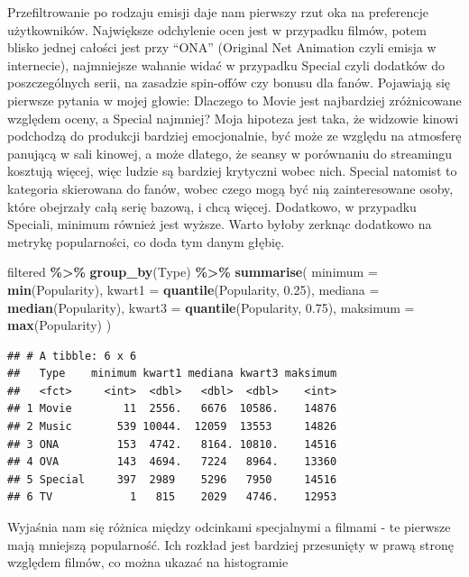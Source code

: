 \documentclass[
]{article}
\newenvironment{Shaded}{\begin{snugshade}}{\end{snugshade}}
\newcommand{\AttributeTok}[1]{\textcolor[rgb]{0.13,0.29,0.53}{#1}}
\newcommand{\FloatTok}[1]{\textcolor[rgb]{0.00,0.00,0.81}{#1}}
\newcommand{\FunctionTok}[1]{\textcolor[rgb]{0.13,0.29,0.53}{\textbf{#1}}}
\newcommand{\NormalTok}[1]{#1}
\newcommand{\SpecialCharTok}[1]{\textcolor[rgb]{0.81,0.36,0.00}{\textbf{#1}}}
\begin{document}
Przefiltrowanie po rodzaju emisji daje nam pierwszy rzut oka na
preferencje użytkowników. Największe odchylenie ocen jest w przypadku
filmów, potem blisko jednej całości jest przy ``ONA'' (Original Net
Animation czyli emisja w internecie), najmniejsze wahanie widać w
przypadku Special czyli dodatków do poszczególnych serii, na zasadzie
spin-offów czy bonusu dla fanów. Pojawiają się pierwsze pytania w mojej
głowie: Dlaczego to Movie jest najbardziej zróżnicowane względem oceny,
a Special najmniej? Moja hipoteza jest taka, że widzowie kinowi
podchodzą do produkcji bardziej emocjonalnie, być może ze względu na
atmosferę panującą w sali kinowej, a może dlatego, że seansy w
porównaniu do streamingu kosztują więcej, więc ludzie są bardziej
krytyczni wobec nich. Special natomist to kategoria skierowana do fanów,
wobec czego mogą być nią zainteresowane osoby, które obejrzały całą
serię bazową, i chcą więcej. Dodatkowo, w przypadku Speciali, minimum
również jest wyższe. Warto byłoby zerknąc dodatkowo na metrykę
popularności, co doda tym danym głębię.

\begin{Shaded}
\begin{Highlighting}[]
\NormalTok{filtered }\SpecialCharTok{\%\textgreater{}\%}
  \FunctionTok{group\_by}\NormalTok{(Type) }\SpecialCharTok{\%\textgreater{}\%}
  \FunctionTok{summarise}\NormalTok{(}
    \AttributeTok{minimum =} \FunctionTok{min}\NormalTok{(Popularity),}
    \AttributeTok{kwart1 =} \FunctionTok{quantile}\NormalTok{(Popularity, }\FloatTok{0.25}\NormalTok{),}
    \AttributeTok{mediana =} \FunctionTok{median}\NormalTok{(Popularity),}
    \AttributeTok{kwart3 =} \FunctionTok{quantile}\NormalTok{(Popularity, }\FloatTok{0.75}\NormalTok{),}
    \AttributeTok{maksimum =} \FunctionTok{max}\NormalTok{(Popularity)}
\NormalTok{    )}
\end{Highlighting}
\end{Shaded}

\begin{verbatim}
## # A tibble: 6 x 6
##   Type    minimum kwart1 mediana kwart3 maksimum
##   <fct>     <int>  <dbl>   <dbl>  <dbl>    <int>
## 1 Movie        11  2556.   6676  10586.    14876
## 2 Music       539 10044.  12059  13553     14826
## 3 ONA         153  4742.   8164. 10810.    14516
## 4 OVA         143  4694.   7224   8964.    13360
## 5 Special     397  2989    5296   7950     14516
## 6 TV            1   815    2029   4746.    12953
\end{verbatim}

Wyjaśnia nam się różnica między odcinkami specjalnymi a filmami - te
pierwsze mają mniejszą popularność. Ich rozkład jest bardziej
przesunięty w prawą stronę względem filmów, co można ukazać na
histogramie
\end{document}

